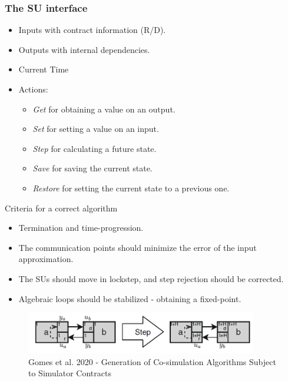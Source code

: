 \documentclass{beamer}
\begin{document}
\begin{frame}
    \frametitle{The SU interface}
    \begin{itemize}
        \item Inputs with contract information (R/D).
        \item Outputs with internal dependencies.
        \item Current Time
        \item Actions:
        \begin{itemize}
            \item \textit{Get} for obtaining a value on an output.
            \item \textit{Set} for setting a value on an input.
            \item \textit{Step} for calculating a future state.
            \item \textit{Save} for saving the current state.
            \item \textit{Restore} for setting the current state to a previous one.
        \end{itemize}
    \end{itemize}
\end{frame}

\begin{frame}{Criteria for a correct algorithm}
    \begin{itemize}
        \item Termination and time-progression.
        \item The communication points should minimize the error of the input approximation.
        \item The SUs should move in lockstep, and step rejection should be corrected.
        \item Algebraic loops should be stabilized - obtaining a fixed-point.
    \end{itemize}

    \begin{figure}    
        \centering
        \includegraphics[width=0.9\textwidth]{images/cosimulation_algortihm.png}
        \caption{Gomes et al. 2020 - Generation of Co-simulation Algorithms Subject to Simulator Contracts}
    \end{figure}
\end{frame}
\end{document}
